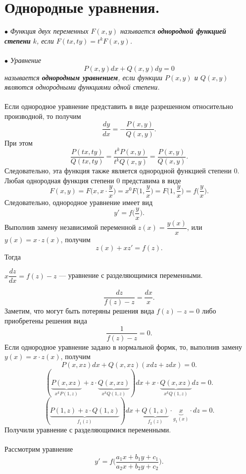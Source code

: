 \documentclass[a4paper, 12pt]{report}
\begin{document}
\section{Однородные уравнения.}
$\bullet$ \textit{Функция двух переменных $F(x,y)$ называется \textbf{однородной функцией степени} $k$, если $F(tx,ty) = t^kF(x,y)$.}\\\\
$\bullet$ \textit{Уравнение $$P(x,y)dx + Q(x,y)dy = 0$$ называется \textbf{однородным уравнением}, если функции $P(x,y)$ и $Q(x,y)$ являются однородными функциями одной степени.}\\\\
Если однородное уравнение представить в виде разрешенном относительно производной, то получим $$\dfrac{dy}{dx} = -\dfrac{P(x,y)}{Q(x,y)}.$$
При этом $$\dfrac{P(tx,ty)}{Q(tx,ty)} = \dfrac{t^kP(x,y)}{t^kQ(x,y)} = \dfrac{P(x,y)}{Q(x,y)}.$$
Следовательно, эта функция также является однородной функцией степени 0. Любая однородная функция степени 0 представима в виде $$F(x,y) = F\Big(x,x\cdot \dfrac{y}{x}\Big) = x^0F\Big(1, \dfrac{y}{x}\Big) =F\Big(1,\dfrac{y}{x}\Big) = f\Big(\dfrac{y}{x}\Big).$$
Следовательно, однородное уравнение имеет вид $$y' = f\Big(\dfrac{y}{x}\Big).$$
Выполнив замену независимой переменной $z(x) = \dfrac{y(x)}{x}$, или $y(x) = x\cdot z(x)$, получим $$z(x) + xz' = f(z).$$
Тогда \begin{center}
	$x\dfrac{dz}{dx} = f(z) - z$ --- уравнение с разделяющимися переменными.
\end{center}
$$\dfrac{dz}{f(z) - z} = \dfrac{dx}{x}.$$
Заметим, что могут быть потеряны решения вида $f(z) - z = 0$ либо приобретены решения вида $$\dfrac{1}{f(z) - z} = 0.$$
Если однородное уравнение задано в нормальной формк, то, выполнив замену $y(x) = x\cdot z(x)$, получим $$P(x,xz)dx + Q(x,xz) (xdz + zdx) = 0.$$
$$(\underbrace{P(x,xz)}_{x^kP(1,z)} + z\cdot \underbrace{Q(x,xz)}_{x^kQ(1,z)})dx +x\cdot  \underbrace{Q(x,xz)}_{x^kQ(1,z)}dz = 0.$$
$$(\underbrace{P(1,z) + z\cdot Q(1,z)}_{f_1(z)})dx + \underbrace{Q(1,z)}_{f_2(z)}\cdot \underbrace{x}_{g_1(x)}\cdot dz = 0.$$
Получили уравнение с разделяющимися переменными.\\\\
Рассмотрим уравнение  $$y' = f\Big(\dfrac{a_1x + b_1y + c_1}{a_2 x + b_2y + c_2}\Big).$$
\end{document}
